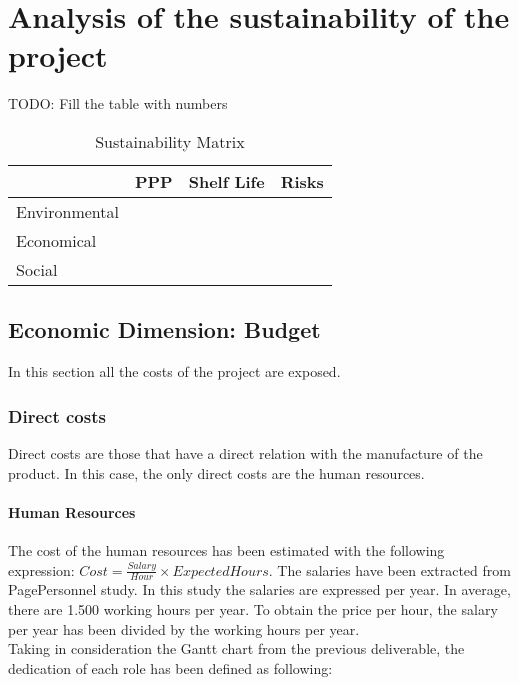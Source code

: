 \chapter{Analysis of the sustainability of the project}
\label{Chapter2}
TODO: Fill the table with numbers
\begin{table}[h]
	\centering
	\begin{tabular}{l|l|l|l|}
		\cline{2-4}
		 & PPP & Shelf Life & Risks \\ \hline
		\multicolumn{1}{|l|}{Environmental} & & & \\ \hline
		\multicolumn{1}{|l|}{Economical} & & & \\ \hline
		\multicolumn{1}{|l|}{Social} & & & \\ \hline
	\end{tabular}
	\caption{Sustainability Matrix}
	\label{SustainabilityMatrix}
\end{table}

\section{Economic Dimension: Budget}
In this section all the costs of the project are exposed. 
\subsection{Direct costs}
Direct costs are those that have a direct relation with the manufacture of the product. In this case, the only direct costs are the human resources. 

\subsubsection{Human Resources}
The cost of the human resources has been estimated with the following expression: $Cost = \frac{Salary}{Hour} \times Expected Hours$. The salaries have been extracted from PagePersonnel study\cite{PagePersonnel}. In this study the salaries are expressed per year. In average, there are 1.500 working hours per year. To obtain the price per hour, the salary per year has been divided by the working hours per year.\\

Taking in consideration the Gantt chart from the previous deliverable, the dedication of each role has been defined as following:

